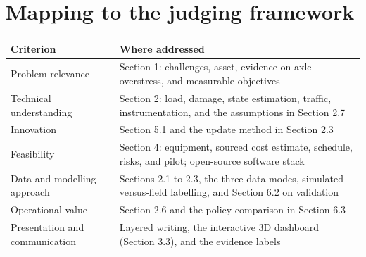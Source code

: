 \documentclass[11pt,a4paper]{article}
\renewcommand{\arraystretch}{1.35}
\begin{document}
\appendix
\section{Mapping to the judging framework}
\renewcommand{\arraystretch}{1.5}
\begin{center}
\small
\begin{tabularx}{\textwidth}{@{}L{4.4cm} X@{}}
\toprule
\textbf{Criterion} & \textbf{Where addressed}\\
\midrule
Problem relevance & Section 1: challenges, asset, evidence on axle overstress, and measurable objectives\\
Technical understanding & Section 2: load, damage, state estimation, traffic, instrumentation, and the assumptions in Section 2.7\\
Innovation & Section 5.1 and the update method in Section 2.3\\
Feasibility & Section 4: equipment, sourced cost estimate, schedule, risks, and pilot; open-source software stack\\
Data and modelling approach & Sections 2.1 to 2.3, the three data modes, simulated-versus-field labelling, and Section 6.2 on validation\\
Operational value & Section 2.6 and the policy comparison in Section 6.3\\
Presentation and communication & Layered writing, the interactive 3D dashboard (Section 3.3), and the evidence labels\\
\bottomrule
\end{tabularx}
\end{center}
\end{document}

